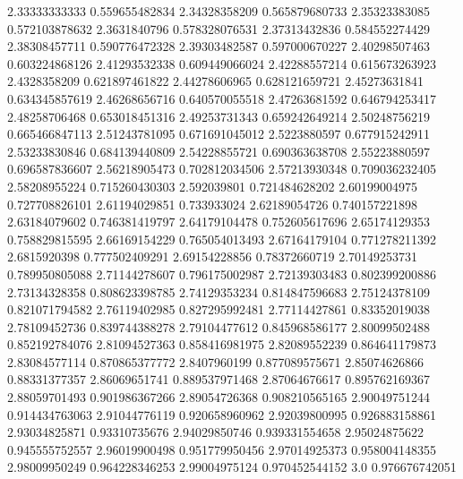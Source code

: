   2.33333333333   0.559655482834
  2.34328358209   0.565879680733
  2.35323383085   0.572103878632
   2.3631840796   0.578328076531
  2.37313432836   0.584552274429
  2.38308457711   0.590776472328
  2.39303482587   0.597000670227
  2.40298507463   0.603224868126
  2.41293532338   0.609449066024
  2.42288557214   0.615673263923
   2.4328358209   0.621897461822
  2.44278606965   0.628121659721
  2.45273631841   0.634345857619
  2.46268656716   0.640570055518
  2.47263681592   0.646794253417
  2.48258706468   0.653018451316
  2.49253731343   0.659242649214
  2.50248756219   0.665466847113
  2.51243781095   0.671691045012
   2.5223880597   0.677915242911
  2.53233830846   0.684139440809
  2.54228855721   0.690363638708
  2.55223880597   0.696587836607
  2.56218905473   0.702812034506
  2.57213930348   0.709036232405
  2.58208955224   0.715260430303
    2.592039801   0.721484628202
  2.60199004975   0.727708826101
  2.61194029851      0.733933024
  2.62189054726   0.740157221898
  2.63184079602   0.746381419797
  2.64179104478   0.752605617696
  2.65174129353   0.758829815595
  2.66169154229   0.765054013493
  2.67164179104   0.771278211392
   2.6815920398   0.777502409291
  2.69154228856    0.78372660719
  2.70149253731   0.789950805088
  2.71144278607   0.796175002987
  2.72139303483   0.802399200886
  2.73134328358   0.808623398785
  2.74129353234   0.814847596683
  2.75124378109   0.821071794582
  2.76119402985   0.827295992481
  2.77114427861    0.83352019038
  2.78109452736   0.839744388278
  2.79104477612   0.845968586177
  2.80099502488   0.852192784076
  2.81094527363   0.858416981975
  2.82089552239   0.864641179873
  2.83084577114   0.870865377772
   2.8407960199   0.877089575671
  2.85074626866    0.88331377357
  2.86069651741   0.889537971468
  2.87064676617   0.895762169367
  2.88059701493   0.901986367266
  2.89054726368   0.908210565165
  2.90049751244   0.914434763063
  2.91044776119   0.920658960962
  2.92039800995   0.926883158861
  2.93034825871    0.93310735676
  2.94029850746   0.939331554658
  2.95024875622   0.945555752557
  2.96019900498   0.951779950456
  2.97014925373   0.958004148355
  2.98009950249   0.964228346253
  2.99004975124   0.970452544152
            3.0   0.976676742051
